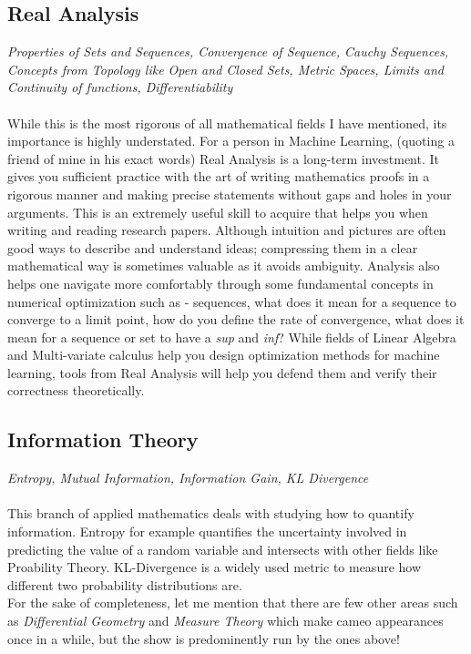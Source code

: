 \documentclass[a4paper]{article}
\begin{document}
\subsection{Real Analysis}
\textit{Properties of Sets and Sequences, Convergence of Sequence, Cauchy Sequences, Concepts from Topology like Open and Closed Sets, Metric Spaces, Limits and Continuity of functions, Differentiability} \\ \\
While this is the most rigorous of all mathematical fields I have mentioned, its importance is highly understated. For a person in Machine Learning, (quoting a friend of mine in his exact words) Real Analysis is a long-term investment. It gives you sufficient practice with the art of writing mathematics proofs in a rigorous manner and making precise statements without gaps and holes in your arguments. This is an extremely useful skill to acquire that helps you when writing and reading research papers. Although intuition and pictures are often good ways to describe and understand ideas; compressing them in a clear mathematical way is sometimes valuable as it avoids ambiguity. Analysis also helps one navigate more comfortably through some fundamental concepts in numerical optimization such as - sequences, what does it mean for a sequence to converge to a limit point, how do you define the rate of convergence, what does it mean for a sequence or set to have a \textit{sup} and \textit{inf}? While fields of Linear Algebra and Multi-variate calculus help you design optimization methods for machine learning, tools from Real Analysis will help you defend them and verify their correctness theoretically. \\

\subsection{Information Theory}
\textit{Entropy, Mutual Information, Information Gain, KL Divergence} \\ \\
This branch of applied mathematics deals with studying how to quantify information. Entropy for example quantifies the uncertainty involved in predicting the value of a random variable and intersects with other fields like Proability Theory. KL-Divergence is a widely used metric to measure how different two probability distributions are. \\

\noindent For the sake of completeness, let me mention that there are few other areas such as {\it Differential Geometry} and {\it Measure Theory} which make cameo appearances once in a while, but the show is predominently run by the ones above!

%
%
\end{document}
